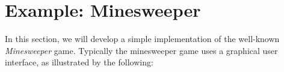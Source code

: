 \newpage
\section{Example: Minesweeper}
In this section, we will develop a simple implementation of the well-known {\em Minesweeper} game.  Typically the minesweeper game uses a graphical user interface, as illustrated by the following:

